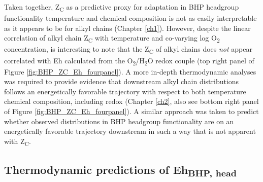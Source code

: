 Taken together, Z\textsubscript{C} as a predictive proxy for adaptation in BHP headgroup functionality temperature and chemical composition is not as easily interpretable as it appears to be for alkyl chains (Chapter \ref{ch1}). However, despite the linear correlation of alkyl chain Z\textsubscript{C} with temperature and co-varying log O\textsubscript{2} concentration, is interesting to note that the Z\textsubscript{C} of alkyl chains does \textit{not} appear correlated with Eh calculated from the O\textsubscript{2}/H\textsubscript{2}O redox couple (top right panel of Figure \ref{fig:BHP_ZC_Eh_fourpanel}). A more in-depth thermodynamic analyses was required to provide evidence that downstream alkyl chain distributions follows an energetically favorable trajectory with respect to both temperature chemical composition, including redox (Chapter \ref{ch2}, also see bottom right panel of Figure \ref{fig:BHP_ZC_Eh_fourpanel}). A similar approach was taken to predict whether observed distributions in BHP headgroup functionality are on an energetically favorable trajectory downstream in such a way that is not apparent with Z\textsubscript{C}.

\subsection{Thermodynamic predictions of Eh\textsubscript{BHP, head}}

